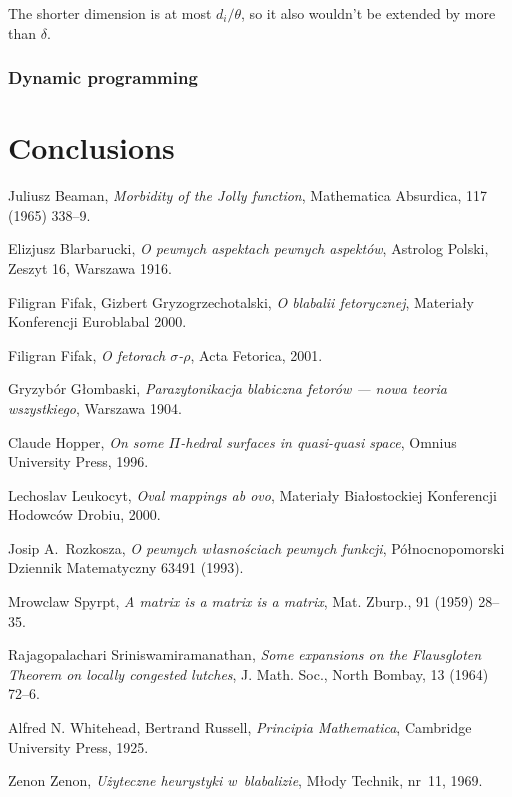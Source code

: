 \documentclass[en]{pracamgr}
\begin{document}
The shorter dimension is at most $d_i/\theta$,
so it also wouldn't be extended by more than $\delta$.



\subsection{Dynamic programming}






\chapter{Conclusions}

\begin{thebibliography}{99}

 Juliusz Beaman, \textit{Morbidity of the Jolly
    function}, Mathematica Absurdica, 117 (1965) 338--9.

 Elizjusz Blarbarucki, \textit{O pewnych
    aspektach pewnych aspektów}, Astrolog Polski, Zeszyt 16, Warszawa
  1916.

 Filigran Fifak, Gizbert Gryzogrzechotalski,
  \textit{O blabalii fetorycznej}, Materiały Konferencji Euroblabal
  2000.

 Filigran Fifak, \textit{O fetorach
    $\sigma$-$\rho$}, Acta Fetorica, 2001.

 Gryzybór Głombaski, \textit{Parazytonikacja
    blabiczna fetorów --- nowa teoria wszystkiego}, Warszawa 1904.

 Claude Hopper, \textit{On some $\Pi$-hedral
    surfaces in quasi-quasi space}, Omnius University Press, 1996.

 Lechoslav Leukocyt, \textit{Oval mappings ab ovo},
  Materiały Białostockiej Konferencji Hodowców Drobiu, 2000.

 Josip A.~Rozkosza, \textit{O pewnych własnościach
    pewnych funkcji}, Północnopomorski Dziennik Matematyczny 63491
  (1993).

 Mrowclaw Spyrpt, \textit{A matrix is a matrix
    is a matrix}, Mat. Zburp., 91 (1959) 28--35.

 Rajagopalachari Sriniswamiramanathan,
  \textit{Some expansions on the Flausgloten Theorem on locally
    congested lutches}, J. Math.  Soc., North Bombay, 13 (1964) 72--6.

 Alfred N. Whitehead, Bertrand Russell,
  \textit{Principia Mathematica}, Cambridge University Press, 1925.

 Zenon Zenon, \textit{Użyteczne heurystyki
    w~blabalizie}, Młody Technik, nr~11, 1969.

\end{thebibliography}
\end{document}
